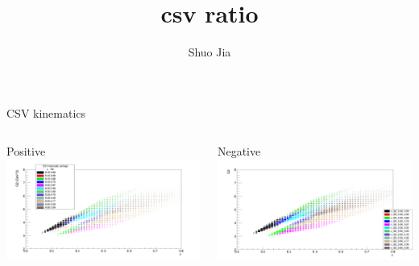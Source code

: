 \documentclass[aspectratio=169,xcolor=dvipsnames]{beamer}
\title{csv ratio}
\date{}
\author{Shuo Jia}
\begin{document}
\maketitle


\begin{frame}{CSV kinematics}
\begin{columns}
\begin{column}[T]{0.5\textwidth}
Positive
\includegraphics[width = \textwidth]{results/yield/kin_x_Q2_pos.png}
\end{column}
\begin{column}[T]{0.5\textwidth}
Negative
\includegraphics[width = \textwidth]{results/yield/kin_x_Q2_neg.png}
\end{column}
\end{columns}
\end{frame}
\end{document}
